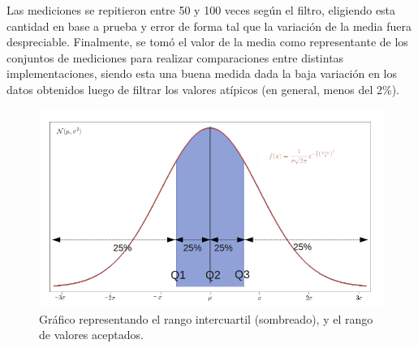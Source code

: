 Las mediciones se repitieron entre 50 y 100 veces según el filtro, eligiendo esta cantidad en base a prueba y error de forma tal que la variación de la media fuera despreciable. Finalmente, se tomó el valor de la media como representante de los conjuntos de mediciones para realizar comparaciones entre distintas implementaciones, siendo esta una buena medida dada la baja variación en los datos obtenidos luego de filtrar los valores atípicos (en general, menos del 2\%).

\begin{figure}[h!]
\begin{center}
  \includegraphics[scale=0.5]{secciones/consideraciones/imagenes/cuartiles.png}
\end{center}
\caption{Gráfico representando el rango intercuartil (sombreado), y el rango de valores aceptados.}
\label{fig:cuariles}
\end{figure}
	

	

